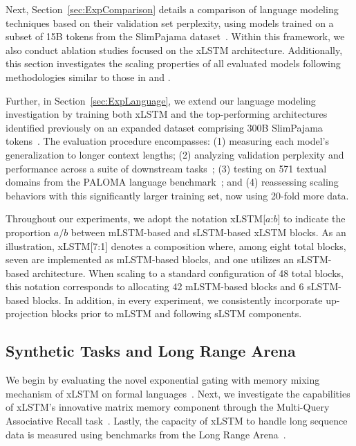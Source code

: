 Next, Section~\ref{sec:ExpComparison} details a comparison of language modeling techniques based on their validation set perplexity, using models trained on a subset of 15B tokens from the SlimPajama dataset~\citep{Soboleva:23}. Within this framework, we also conduct ablation studies focused on the xLSTM architecture. Additionally, this section investigates the scaling properties of all evaluated models following methodologies similar to those in \citet{Kaplan:20} and \citet{Brown:20short}. 

Further, in Section~\ref{sec:ExpLanguage}, we extend our language modeling investigation by training both xLSTM and the top-performing architectures identified previously on an expanded dataset comprising 300B SlimPajama tokens~\citep{Soboleva:23}. The evaluation procedure encompasses: (1) measuring each model's generalization to longer context lengths; (2) analyzing validation perplexity and performance across a suite of downstream tasks~\citep{Sutawika:24}; (3) testing on 571 textual domains from the PALOMA language benchmark~\citep{Magnusson:23arxivshort}; and (4) reassessing scaling behaviors with this significantly larger training set, now using 20-fold more data.

Throughout our experiments, we adopt the notation xLSTM[$a$:$b$] to indicate the proportion $a/b$ between mLSTM-based and sLSTM-based xLSTM blocks. As an illustration, xLSTM[7:1] denotes a composition where, among eight total blocks, seven are implemented as mLSTM-based blocks, and one utilizes an sLSTM-based architecture. When scaling to a standard configuration of 48 total blocks, this notation corresponds to allocating 42 mLSTM-based blocks and 6 sLSTM-based blocks. In addition, in every experiment, we consistently incorporate up-projection blocks prior to mLSTM and following sLSTM components.

\subsection{Synthetic Tasks and Long Range Arena}
\label{sec:ExpSyntethic}
We begin by evaluating the novel exponential gating with memory mixing mechanism of xLSTM on formal languages~\citep{Deletang:23}. Next, we investigate the capabilities of xLSTM’s innovative matrix memory component through the Multi-Query Associative Recall task~\citep{Arora:23arxiv}. Lastly, the capacity of xLSTM to handle long sequence data is measured using benchmarks from the Long Range Arena~\citep{Tay:21}.

